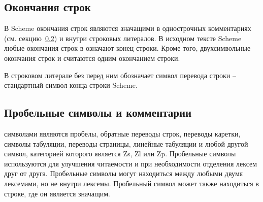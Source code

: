 \subsection{Окончания строк}
\label{lineendings}

В Scheme окончания строк являются значащими в однострочных комментариях
(см. секцию~\ref{whitespaceandcomments}) и внутри строковых литералов. В исходном тексте Scheme
любые окончания строк в  означают конец строки. Кроме того, двухсимвольные
окончания строк   и   считаются одним окончанием строки.

В строковом литерале  без {\cf\backwhack} перед ним обозначает
символ перевода строки -- стандартный символ конца строки Scheme.

\subsection{Пробельные символы и комментарии}
\label{whitespaceandcomments}

 символами являются пробелы, обратные переводы строк, переводы каретки, символы
табуляции, переводы страницы, линейные табуляции и любой другой символ, категорией которого является Zs,
Zl или Zp. Пробельные символы используются для улучшения читаемости и при необходимости
отделения лексем друг от друга. Пробельные символы могут находиться между любыми двумя
лексемами, но не внутри лексемы. Пробельный символ может также находиться в строке, где он
является значащим.

